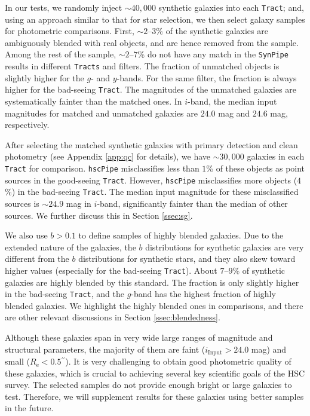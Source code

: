 \documentclass[useamsfonts]{pasj01}
\def\asec{$^{\prime\prime}$}
\def\hscpipe{\texttt{hscPipe}}
\def\synpipe{\texttt{SynPipe}}
\def\tract{\texttt{Tract}}
\def\tracts{\texttt{Tracts}}
\begin{document}
    In our tests, we randomly inject ${\sim}40,000$ synthetic galaxies into each
    \tract{}; and, using an approach similar to that for star selection, we then select galaxy samples for photometric comparisons.
    First, ${\sim}2$--$3$\% of the synthetic galaxies are ambiguously blended with
    real objects, and are hence removed from the sample.
    Among the rest of the sample, ${\sim}2$--$7$\% do not have any match in the
    \synpipe{} results in different \tracts{} and filters.
    The fraction of unmatched objects is slightly higher for the $g$- and $y$-bands.
    For the same filter, the fraction is always higher for the bad-seeing \tract{}.
    The magnitudes of the unmatched galaxies are systematically fainter than the
    matched ones.
    In $i$-band, the median input magnitudes for matched and unmatched galaxies are
    $24.0$ mag and $24.6$ mag, respectively.

    After selecting the matched synthetic galaxies with primary detection and
    clean photometry (see Appendix \ref{app:qc} for details), we have ${\sim}30,000$
    galaxies in each \tract{} for comparison.
   \hscpipe{} misclassifies less than $1$\% of these objects as point sources
    in the good-seeing \tract{}.
    However,   \hscpipe{} misclassifies more objects ($4$\%) in the bad-seeing \tract{}.
    The median input magnitude for these misclassified sources is ${\sim}24.9$ mag
    in $i$-band, significantly fainter than the median of other sources.
    We further discuss this in Section \ref{ssec:sg}.

    We also use $b>0.1$ to define samples of highly blended galaxies.
    Due to the extended nature of the galaxies, the $b$ distributions for synthetic galaxies are
    very different from the  $b$ distributions for synthetic stars, and they also skew toward higher values (especially for the
    bad-seeing \tract{}).
    About $7$--$9$\% of synthetic galaxies are highly blended by this standard.
    The fraction is only slightly higher in the bad-seeing \tract{}, and the
    $g$-band has the highest fraction of highly blended galaxies.
    We highlight the highly blended ones in comparisons, and there are other relevant
    discussions in Section \ref{ssec:blendedness}.

    Although these galaxies span in very wide large ranges of magnitude and
    structural parameters, the majority of them are faint
    ($i_{\mathrm{Input}} > 24.0$ mag) and small ($R_{\mathrm{e}} < 0.5$\asec).
    It is very challenging to obtain good photometric quality of these galaxies, which is crucial
    to achieving several key scientific goals of the HSC survey.
    The selected samples do not provide enough bright or large galaxies to test.
    Therefore, we will supplement results for these galaxies using better samples
    in the future.
\end{document}
